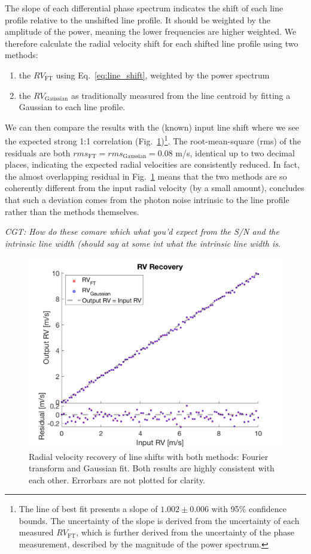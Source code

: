 The slope of each differential phase spectrum indicates the shift of each line profile relative to 
the unshifted line profile. It should be weighted by the amplitude of the power, meaning the lower frequencies 
are higher weighted. We therefore calculate the radial velocity shift for each shifted line profile
using two methods: 
\begin{enumerate}
	\item the $RV_\text{FT}$ using Eq.~\ref{eq:line_shift}, weighted by the power spectrum
	\item the $RV_\text{Gaussian}$ as traditionally measured from the line centroid by fitting a Gaussian to each line profile.
\end{enumerate}
We can then compare the results with the (known) input line shift where we see the expected strong 1:1 correlation (Fig.~\ref{fig:rv_recovery})\footnote{The line of best fit presents a slope of $1.002\pm0.006$ with 95\% confidence bounds. The uncertainty of the slope is derived from the uncertainty of each measured $RV_\text{FT}$, which is further derived from the uncertainty of the phase measurement, described by the magnitude of the power spectrum.}. The root-mean-square (rms) of the residuals are both $rms_\text{FT} = rms_\text{Gaussian} = 0.08$ m/s, identical up to two decimal places, indicating the expected radial velocities are consistently reduced. In fact, the almost overlapping residual in Fig.~\ref{fig:rv_recovery} means that the two methods are so coherently different from the input radial velocity (by a small amount), concludes that such a deviation comes from the photon noise intrinsic to the line profile rather than the methods themselves. 

{\em CGT: How do these comare which what you'd expect from the S/N and the intrinsic line width (should say at some int what the intrinsic line width is}.

\begin{figure}[tbp]
\centering
\includegraphics[width = 0.7 \linewidth]
{./Figures/Methods/5-LINE_SHIFT_ONLY.png}
\caption[Radial velocity recovery]
{Radial velocity recovery of line shifts with both methods: Fourier transform and Gaussian fit. Both results are highly consistent with each other. Errorbars are not plotted for clarity.}
\label{fig:rv_recovery}
\end{figure} 
\FloatBarrier

